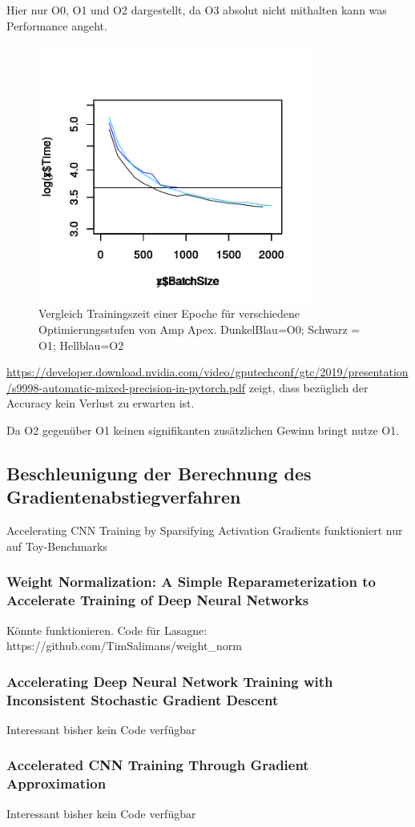 Hier nur O0, O1 und O2 dargestellt, da O3 absolut nicht mithalten kann was Performance angeht.

\begin{figure}[h]
 \centering
 \includegraphics[width=0.8\textwidth]{KapitelPartB/Images/timeVsBatchSize_Amp.png}
 \caption{Vergleich Trainingszeit einer Epoche für verschiedene Optimierungsstufen von Amp Apex. DunkelBlau=O0; Schwarz = O1; Hellblau=O2}
 \label{fig:amp}
\end{figure}
\url{https://developer.download.nvidia.com/video/gputechconf/gtc/2019/presentation/s9998-automatic-mixed-precision-in-pytorch.pdf} zeigt, dass bezüglich der Accuracy kein Verlust zu erwarten ist.

Da O2 gegenüber O1 keinen signifikanten zusätzlichen Gewinn bringt nutze O1.
\subsection{Beschleunigung der Berechnung des Gradientenabstiegverfahren}

Accelerating CNN Training by Sparsifying Activation Gradients funktioniert nur auf Toy-Benchmarks 


\subsubsection{Weight Normalization: A Simple Reparameterization
to Accelerate Training of Deep Neural Networks}


Könnte funktionieren. Code für Lasagne: https://github.com/TimSalimans/weight\_norm


\subsubsection{Accelerating Deep Neural Network Training with Inconsistent Stochastic Gradient Descent}

Interessant bisher kein Code verfügbar

\subsubsection{Accelerated CNN Training Through Gradient Approximation }

Interessant bisher kein Code verfügbar


